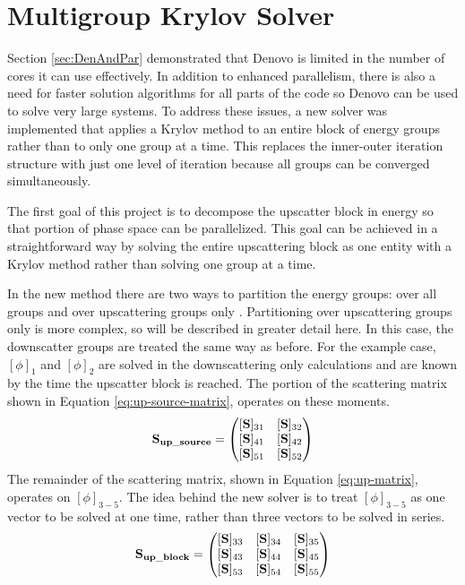 \section{Multigroup Krylov Solver}
\label{subsec:KrylovMethod}
Section \ref{sec:DenAndPar} demonstrated that Denovo is limited in the number of cores it can use effectively. In addition to enhanced parallelism, there is also a need for faster solution algorithms for all parts of the code so Denovo can be used to solve very large systems. To address these issues, a new solver was implemented that applies a Krylov method to an entire block of energy groups rather than to only one group at a time. This replaces the inner-outer iteration structure with just one level of iteration because all groups can be converged simultaneously. 

The first goal of this project is to decompose the upscatter block in energy so that portion of phase space can be parallelized. This goal can be achieved in a straightforward way by solving the entire upscattering block as one entity with a Krylov method rather than solving one group at a time. 

In the new method there are two ways to partition the energy groups: over all groups and over upscattering groups only \cite{Evans2010}. Partitioning over upscattering groups only is more complex, so will be described in greater detail here. In this case, the downscatter groups are treated the same way as before. For the example case, $[\phi]_{1}$ and $[\phi]_{2}$ are solved in the downscattering only calculations and are known by the time the upscatter block is reached. The portion of the scattering matrix shown in Equation \eqref{eq:up-source-matrix}, operates on these moments. 
%
 \begin{equation}
  \mathbf{S_{up\_source}}  =     \begin{pmatrix}
      [\ve{S}]_{31} & [\ve{S}]_{32}  \\
      [\ve{S}]_{41} & [\ve{S}]_{42}  \\
      [\ve{S}]_{51} & [\ve{S}]_{52} 
    \end{pmatrix} 
    \label{eq:up-source-matrix} 
 \end{equation}
%
The remainder of the scattering matrix, shown in Equation \eqref{eq:up-matrix}, operates on $[\phi]_{3-5}$. The idea behind the new solver is to treat $[\phi]_{3-5}$ as one vector to be solved at one time, rather than three vectors to be solved in series. 
%
 \begin{equation}
  \mathbf{S_{up\_block}}  =     \begin{pmatrix}
      [\ve{S}]_{33} & [\ve{S}]_{34} & [\ve{S}]_{35} \\
      [\ve{S}]_{43} & [\ve{S}]_{44} & [\ve{S}]_{45} \\
      [\ve{S}]_{53} & [\ve{S}]_{54} & [\ve{S}]_{55}
    \end{pmatrix} 
    \label{eq:up-matrix}
\end{equation}

